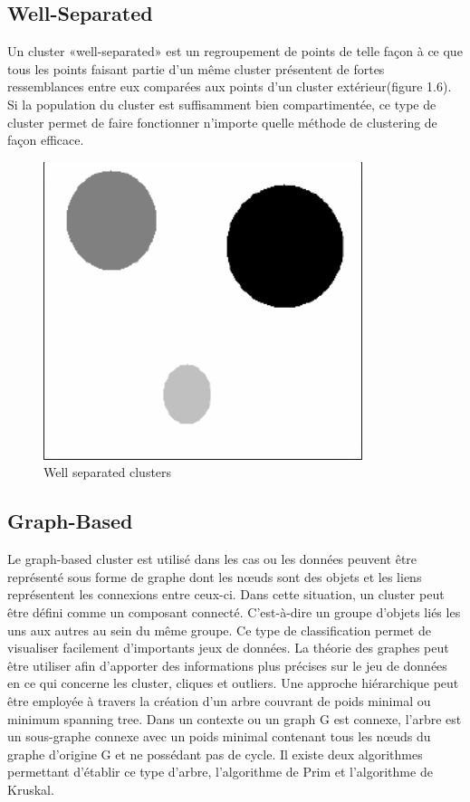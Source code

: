 \documentclass[memoire.tex]{subfiles}
\begin{document}
\subsection{Well-Separated}
Un cluster «well-separated» est un regroupement de points de telle façon à ce que tous les points faisant partie d'un même cluster présentent de fortes ressemblances entre eux comparées aux points d'un cluster extérieur(figure 1.6). Si la population du cluster est suffisamment bien compartimentée, ce type de cluster permet de faire fonctionner n'importe quelle méthode de clustering de façon efficace.
	\begin{figure}[h!]
		\centerline{\includegraphics[scale=0.5]{img/well_separated.png}}
		\caption{Well separated clusters}
	\end{figure}

\subsection{Graph-Based}
Le graph-based cluster est utilisé dans les cas ou les données peuvent être représenté sous forme de graphe dont les nœuds sont des objets et les liens représentent les connexions entre ceux-ci. Dans cette situation, un cluster peut être défini comme un composant connecté.  C'est-à-dire un groupe d'objets liés les uns aux autres au sein du même groupe. Ce type de classification permet de visualiser facilement d'importants jeux de données.
La théorie des graphes peut être utiliser afin d’apporter des informations plus précises sur le jeu de données en ce qui concerne les cluster, cliques et outliers. Une approche hiérarchique peut être employée à travers la création d’un arbre couvrant de poids minimal ou minimum spanning tree. Dans un contexte ou un graph G est connexe, l’arbre est un sous-graphe connexe avec un poids minimal contenant tous les nœuds du graphe d’origine G et ne possédant pas de cycle. Il existe deux algorithmes permettant d’établir ce type d’arbre, l’algorithme de Prim et l’algorithme de Kruskal.
\end{document}
